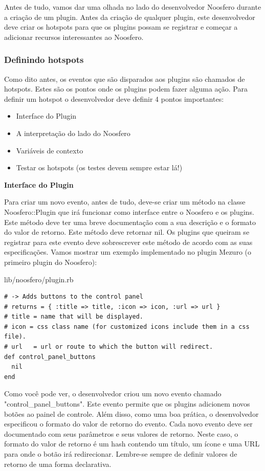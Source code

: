 \documentclass[11pt]{article}
\begin{document}
Antes de tudo, vamos dar uma olhada no lado do desenvolvedor Noosfero durante
a criação de um plugin. Antes da criação de qualquer plugin, este
desenvolvedor deve criar os hotspots para que os plugins possam se registrar e
começar a adicionar recursos interessantes ao Noosfero.

\subsubsection{Definindo hotspots}

Como dito antes, os eventos que são disparados aos plugins são chamados de
hotspots. Estes são os pontos onde os plugins podem fazer alguma ação. Para
definir um hotspot o desenvolvedor deve definir 4 pontos importantes:

\begin{itemize}
  \item Interface do Plugin
  \item A interpretação do lado do Noosfero
  \item Variáveis de contexto
  \item Testar os hotspots (os testes devem sempre estar lá!)
\end{itemize}

{\bf Interface do Plugin}

Para criar um novo evento, antes de tudo, deve-se criar um método na classe
Noosfero::Plugin que irá funcionar como interface entre o Noosfero e os
plugins. Este método deve ter uma breve documentação com a sua descrição e o
formato do valor de retorno. Este método deve retornar nil. Os plugins que
queiram se registrar para este evento deve sobrescrever este método de acordo
com as suas especificações. Vamos mostrar um exemplo implementado no plugin
Mezuro (o primeiro plugin do Noosfero):

lib/noosfero/plugin.rb
\begin{Verbatim}[frame=single,fontfamily=courier]
# -> Adds buttons to the control panel
# returns = { :title => title, :icon => icon, :url => url }
# title = name that will be displayed.
# icon = css class name (for customized icons include them in a css file).
# url   = url or route to which the button will redirect.
def control_panel_buttons
  nil
end
\end{Verbatim}

Como você pode ver, o desenvolvedor criou um novo evento chamado
"control\_panel\_buttons". Este evento permite que os plugins adicionem novos
botões ao painel de controle. Além disso, como uma boa prática, o
desenvolvedor especificou o formato do valor de retorno do evento. Cada novo
evento deve ser documentado com seus parâmetros e seus valores de retorno.
Neste caso, o formato do valor de retorno é um hash contendo um título, um
ícone e uma URL para onde o botão irá redirecionar. Lembre-se sempre de
definir valores de retorno de uma forma declarativa.
\end{document}
